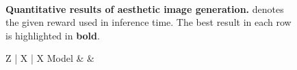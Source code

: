 \begin{figure}[t!]
    \centering
    \begin{minipage}{0.44\linewidth}
        \centering
        \scriptsize
        \setlength{\tabcolsep}{2.9pt}
        \newcommand{\good}[1]{\tiny{\textcolor{blue}{+#1\%}}}
        \newcommand{\bad}[1]{\tiny{\textcolor{red}{-#1\%}}}
        {\textbf{Quantitative results of aesthetic image generation.} \textsuperscript{\textdagger} denotes the given reward used in inference time. The best result in each row is highlighted in \textbf{bold}.}
        \label{tab:aesthetic}
        \begin{tabular}{Z | X | X }
        \toprule
        Model &  &  \\

\end{tabular}
\end{minipage}
\end{figure}
